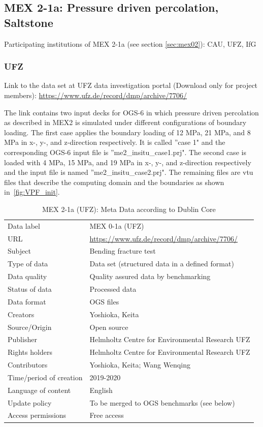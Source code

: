 \subsection{MEX 2-1a: Pressure driven percolation, Saltstone}

Participating institutions of MEX 2-1a (see section \ref{sec:mex02}): CAU, UFZ, IfG

\subsubsection*{UFZ}

Link to the data set at UFZ data investigation portal (Download only for project members):
\url{https://www.ufz.de/record/dmp/archive/7706/}

The link contains two input decks for OGS-6 in which pressure driven percolation as described in MEX2 is simulated under different configurations of boundary loading.
The first case applies the boundary loading of 12 MPa, 21 MPa, and 8 MPa in x-, y-, and z-direction respectively. It is called ''case 1" and the corresponding OGS-6 input file is ''me2\_insitu\_case1.prj".
The second case is loaded with 4 MPa, 15 MPa, and 19 MPa in x-, y-, and z-direction respectively and the input file is named ''me2\_insitu\_case2.prj".
The remaining files are vtu files that describe the computing domain and the boundaries as shown in~\ref{fig:VPF_init}.

\begin{table}[!ht]
\caption{MEX 2-1a (UFZ): Meta Data according to Dublin Core}
\label{tab:dms-mex2-1a}
\small
\begin{tabular}{R{3.5cm}|L{7.5cm}}
\hline
%
Data label & MEX 0-1a (UFZ) \\
URL & \url{https://www.ufz.de/record/dmp/archive/7706/} \\ 
Subject  & Bending fracture test \\
Type of data  & Data set (structured data in a defined format) \\
Data quality  & Quality assured data by benchmarking \\
Status of data  & Processed data \\
Data format  & OGS files \\
Creators  & Yoshioka, Keita  \\
Source/Origin & Open source \\
Publisher  & Helmholtz Centre for Environmental Research UFZ \\
Rights holders & Helmholtz Centre for Environmental Research UFZ \\
Contributors & Yoshioka, Keita; Wang Wenqing \\
Time/period of creation & 2019-2020 \\
Language of content & English \\
Update policy & To be merged to OGS benchmarks (see below) \\
Access permissions & Free access \\
%
\hline
\end{tabular}
\end{table}

